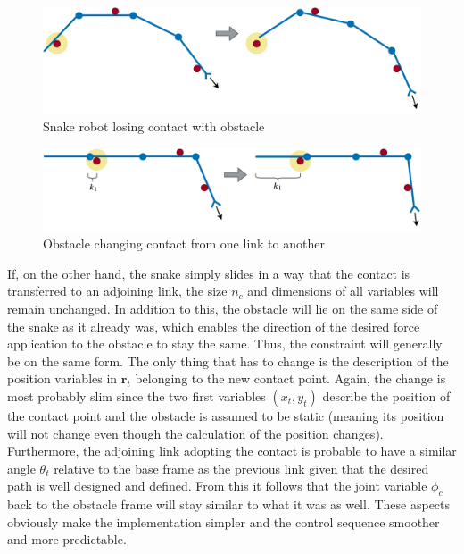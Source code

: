 \begin{figure}[h!]
    \centering
    \includegraphics[width=\textwidth]{figures/theory/obst_slide_sequence1.pdf}
    \caption{Snake robot losing contact with obstacle}
    \label{fig:obst_slide_seq1}
\end{figure}

\begin{figure}[h!]
    \centering
    \includegraphics[width=\textwidth]{figures/theory/obst_slide_sequence2.pdf}
    \caption{Obstacle changing contact from one link to another}
    \label{fig:obst_slide_seq2}
\end{figure}

If, on the other hand, the snake simply slides in a way that the contact is transferred to an adjoining link, the size $n_c$ and dimensions of all variables will remain unchanged. In addition to this, the obstacle will lie on the same side of the snake as it already was, which enables the direction of the desired force application to the obstacle to stay the same. Thus, the constraint will generally be on the same form. The only thing that has to change is the description of the position variables in $\mathbf{r}_t$ belonging to the new contact point. Again, the change is most probably slim since the two first variables $(x_t, y_t)$ describe the position of the contact point and the obstacle is assumed to be static (meaning its position will not change even though the calculation of the position changes). Furthermore, the adjoining link adopting the contact is probable to have a similar angle $\theta_t$ relative to the base frame as the previous link given that the desired path is well designed and defined. From this it follows that the joint variable $\phi_c$ back to the obstacle frame will stay similar to what it was as well. These aspects obviously make the implementation simpler and the control sequence smoother and more predictable.

